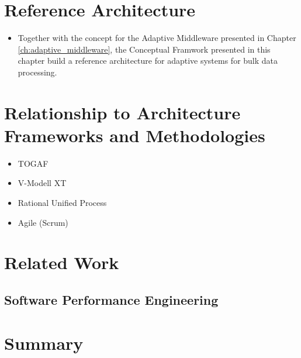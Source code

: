 
\section{Reference Architecture}

\begin{itemize}
	\item Together with the concept for the Adaptive Middleware presented in Chapter \ref{ch:adaptive_middleware}, the Conceptual Framwork presented in this chapter build a reference architecture for adaptive systems for bulk data processing.
\end{itemize}

\section{Relationship to Architecture Frameworks and Methodologies} %
\label{sec:ch6_relation_frameworks}
\begin{itemize}
	\item TOGAF
	\item V-Modell XT
	\item Rational Unified Process
	\item Agile (Scrum)
\end{itemize}


\section{Related Work}
\label{sec:ch6_related_work}

\subsection{Software Performance Engineering} %


\section{Summary} 
